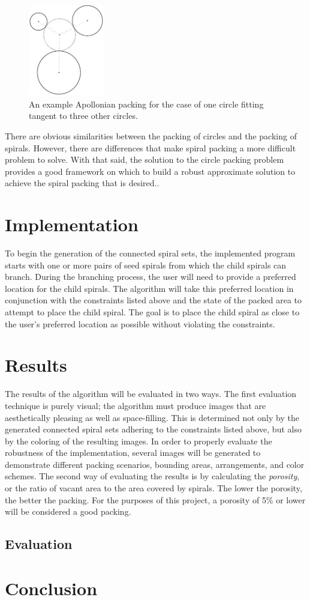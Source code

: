 \documentclass[11pt]{IEEEtran}
\begin{document}
\begin{figure}[H]
\centering \includegraphics[width=33.3mm, height=40mm]{spiral-circles}
\caption{An example Apollonian packing for the case of one circle fitting tangent to three other circles.\cite{Browne2006834}}
\label{fig:circle}
\end{figure}

There are obvious similarities between the packing of circles and the packing of spirals. However, there are differences that make spiral packing a more difficult problem to solve. With that said, the solution to the circle packing problem provides a good framework on which to build a robust approximate solution to achieve the spiral packing that is desired.\cite{Browne2006834}.


\section{Implementation}
To begin the generation of the connected spiral sets, the implemented program starts with one or more pairs of seed spirals from which the child spirals can branch. During the branching process, the user will need to provide a preferred location for the child spirals. The algorithm will take this preferred location in conjunction with the constraints listed above and the state of the packed area to attempt to place the child spiral. The goal is to place the child spiral as close to the user's preferred location as possible without violating the constraints.

\section{Results}
The results of the algorithm will be evaluated in two ways. The first evaluation technique is purely visual; the algorithm must produce images that are aesthetically pleasing as well as space-filling. This is determined not only by the generated connected spiral sets adhering to the constraints listed above, but also by the coloring of the resulting images. In order to properly evaluate the robustness of the implementation, several images will be generated to demonstrate different packing scenarios, bounding areas, arrangements, and color schemes. The second way of evaluating the results is by calculating the \textit{porosity}, or the ratio of vacant area to the area covered by spirals. The lower the porosity, the better the packing. For the purposes of this project, a porosity of 5\% or lower will be considered a good packing. 

\subsection{Evaluation}


\section{Conclusion}



{}
\end{document}
